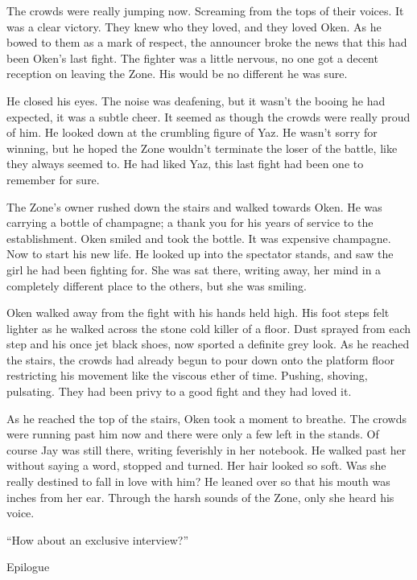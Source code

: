 The crowds were really jumping now.  Screaming from the tops of their voices.  It was a clear victory.  They knew who they loved, and they loved Oken.  As he bowed to them as a mark of respect, the announcer broke the news that this had been Oken's last fight.  The fighter was a little nervous, no one got a decent reception on leaving the Zone.  His would be no different he was sure.

He closed his eyes.  The noise was deafening, but it wasn't the booing he had expected, it was a subtle cheer.  It seemed as though the crowds were really proud of him.  He looked down at the crumbling figure of Yaz.  He wasn't sorry for winning, but he hoped the Zone wouldn't terminate the loser of the battle, like they always seemed to.  He had liked Yaz, this last fight had been one to remember for sure.  

The Zone's owner rushed down the stairs and walked towards Oken.  He was carrying a bottle of champagne; a thank you for his years of service to the establishment.  Oken smiled and took the bottle.  It was expensive champagne.  Now to start his new life.  He looked up into the spectator stands, and saw the girl he had been fighting for.  She was sat there, writing away, her mind in a completely different place to the others, but she was smiling.

Oken walked away from the fight with his hands held high.  His foot steps felt lighter as he walked across the stone cold killer of a floor.  Dust sprayed from each step and his once jet black shoes, now sported a definite grey look.  As he reached the stairs, the crowds had already begun to pour down onto the platform floor restricting his movement like the viscous ether of time.  Pushing, shoving, pulsating.  They had been privy to a good fight and they had loved it.

As he reached the top of the stairs, Oken took a moment to breathe.  The crowds were running past him now and there were only a few left in the stands.  Of course Jay was still there, writing feverishly in her notebook.  He walked past her without saying a word, stopped and turned.  Her hair looked so soft.  Was she really destined to fall in love with him?  He leaned over so that his mouth was inches from her ear.  Through the harsh sounds of the Zone, only she heard his voice.

``How about an exclusive interview?''





Epilogue    



